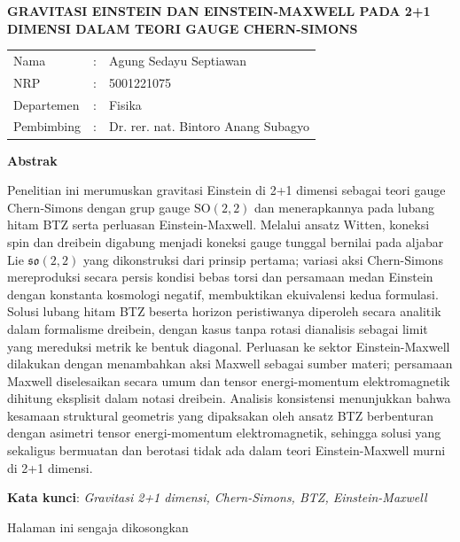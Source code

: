 \begin{center}
	\large{\textbf{GRAVITASI EINSTEIN DAN EINSTEIN-MAXWELL PADA 2+1 DIMENSI DALAM TEORI GAUGE CHERN-SIMONS}}
\end{center}

\vspace{1em}

\noindent
\begin{tabular}{@{}lcl@{}}
	Nama       & : & Agung Sedayu Septiawan \\
	NRP        & : & 5001221075 \\
	Departemen & : & Fisika \\
	Pembimbing & : & Dr. rer. nat. Bintoro Anang Subagyo \\
\end{tabular}

\vspace{1em}

\noindent\textbf{Abstrak}

\par Penelitian ini merumuskan gravitasi Einstein di 2+1 dimensi sebagai teori gauge Chern-Simons dengan grup gauge $\mathrm{SO}(2,2)$ dan menerapkannya pada lubang hitam BTZ serta perluasan Einstein-Maxwell. Melalui ansatz Witten, koneksi spin dan dreibein digabung menjadi koneksi gauge tunggal bernilai pada aljabar Lie $\mathfrak{so}(2,2)$ yang dikonstruksi dari prinsip pertama; variasi aksi Chern-Simons mereproduksi secara persis kondisi bebas torsi dan persamaan medan Einstein dengan konstanta kosmologi negatif, membuktikan ekuivalensi kedua formulasi. Solusi lubang hitam BTZ beserta horizon peristiwanya diperoleh secara analitik dalam formalisme dreibein, dengan kasus tanpa rotasi dianalisis sebagai limit yang mereduksi metrik ke bentuk diagonal. Perluasan ke sektor Einstein-Maxwell dilakukan dengan menambahkan aksi Maxwell sebagai sumber materi; persamaan Maxwell diselesaikan secara umum dan tensor energi-momentum elektromagnetik dihitung eksplisit dalam notasi dreibein. Analisis konsistensi menunjukkan bahwa kesamaan struktural geometris yang dipaksakan oleh ansatz BTZ berbenturan dengan asimetri tensor energi-momentum elektromagnetik, sehingga solusi yang sekaligus bermuatan dan berotasi tidak ada dalam teori Einstein-Maxwell murni di 2+1 dimensi.

\vspace{1em}

\noindent\textbf{Kata kunci}: \textit{Gravitasi 2+1 dimensi, Chern-Simons, BTZ, Einstein-Maxwell}

\newpage
\thispagestyle{empty}
\vspace*{\fill}
    \begin{center}
	Halaman ini sengaja dikosongkan
    \end{center}
\vspace*{\fill}
\pagebreak
